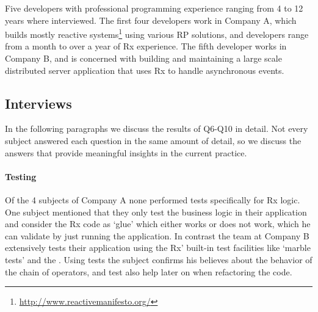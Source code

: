 Five developers with professional programming experience ranging from 4 to 12 years where interviewed.
The first four developers work in Company A, which builds mostly reactive systems\footnote{\url{http://www.reactivemanifesto.org/}} using various RP solutions,
and developers range from a month to over a year of Rx experience. 
The fifth developer works in Company B, and is concerned with building and maintaining a large scale distributed server application that uses Rx to handle asynchronous events.

\subsection{Interviews}
In the following paragraphs we discuss the results of Q6-Q10 in detail. Not every subject answered each question in the same amount of detail, so we discuss the answers that provide meaningful insights in the current practice.

\paragraph{Testing}
Of the 4 subjects of Company A none performed tests specifically for Rx logic. One subject mentioned that they only test the business logic in their application and consider the Rx code as `glue' which either works or does not work, which he can validate by just running the application. In contrast the team at Company B extensively tests their application using the Rx' built-in test facilities like `marble tests' and the . Using tests the subject confirms his believes about the behavior of the chain of operators, and test also help later on when refactoring the code.


